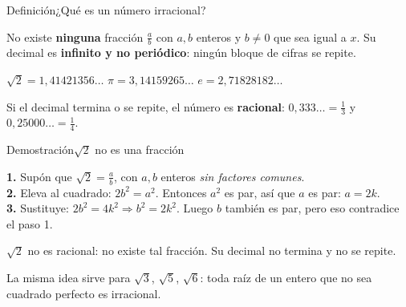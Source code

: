 \documentclass[12pt]{article}
\begin{document}
\begin{mwmodlamina}[mwvioleta]{Definición}{¿Qué es un número irracional?}
\begin{mwcajaformula}
\end{mwcajaformula}

\begin{mwcaja}
  {\mwsmall No existe \textbf{ninguna} fracción $\frac{a}{b}$ con
  $a,b$ enteros y $b\neq0$ que sea igual a $x$. Su decimal es
  \textbf{infinito y no periódico}: ningún bloque de cifras se
  repite.}
\end{mwcaja}

\begin{mwcaja}
  \centering
  {\mwsmall
  $\sqrt2=1{,}41421356\ldots$\quad
  $\pi=3{,}14159265\ldots$\quad
  $e=2{,}71828182\ldots$}
\end{mwcaja}

\begin{mwcajagris}
  {\mwsmall Si el decimal termina o se repite, el número es
  \textbf{racional}: $0{,}333\ldots=\frac13$ y
  $0{,}25000\ldots=\frac14$.}
\end{mwcajagris}
\end{mwmodlamina}

\begin{mwmodlamina}[mwmagenta]{Demostración}{$\sqrt2$ no es una fracción}
\begin{mwcajapaso}
  {\mwsmall
  \textbf{1.} Supón que $\sqrt2=\frac{a}{b}$, con $a,b$ enteros
  \emph{sin factores comunes}.\\[3pt]
  \textbf{2.} Eleva al cuadrado: $2b^2=a^2$. Entonces $a^2$ es par,
  así que $a$ es par: $a=2k$.\\[3pt]
  \textbf{3.} Sustituye: $2b^2=4k^2 \Rightarrow b^2=2k^2$. Luego
  $b$ también es par, pero eso contradice el paso 1.}
\end{mwcajapaso}

\begin{mwcajaok}
  {\mwsmall $\sqrt2$ no es racional: no existe tal fracción. Su
  decimal no termina y no se repite.}
\end{mwcajaok}

\begin{mwcajagris}
  {\mwsmall La misma idea sirve para $\sqrt3$, $\sqrt5$, $\sqrt6$:
  toda raíz de un entero que no sea cuadrado perfecto es irracional.}
\end{mwcajagris}
\end{mwmodlamina}
\end{document}
